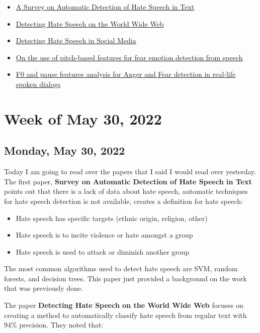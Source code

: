 \documentclass[11pt,letterpaper]{article}
\begin{document}
\begin{itemize}
    \item \href{https://sci-hub.hkvisa.net/10.1145/3232676}{A Survey on Automatic Detection of Hate Speech in Text}
    \item \href{https://aclanthology.org/W12-2103.pdf}{Detecting Hate Speech on the World Wide Web}
    \item \href{https://arxiv.org/abs/1712.06427}{Detecting Hate Speech in Social Media}
    \item \href{https://sci-hub.hkvisa.net/10.1109/ATSIP.2018.8364512}{On the use of pitch-based features for fear emotion detection from speech}
    \item \href{https://www.isca-speech.org/archive_open/sp2004/sp04_205.pdf}{F0 and pause features analysis for Anger and Fear detection in real-life spoken dialogs}
\end{itemize}

\section{Week of May 30, 2022}
\subsection{Monday, May 30, 2022}
Today I am going to read over the papers that I said I would read over yesterday. The first paper, \textbf{Survey on Automatic Detection of Hate Speech in Text} points out that there is a lack of data about hate speech, automatic techniques for hate speech detection is not available, creates a definition for hate speech:

\begin{itemize}
    \item Hate speech has specific targets (ethnic origin, religion, other)
    \item Hate speech is to incite violence or hate amongst a group
    \item Hate speech is used to attack or diminish another group
\end{itemize}

The most common algorithms used to detect hate speech are SVM, random forests, and decision trees. This paper just provided a background on the work that was previously done.

The paper \textbf{Detecting Hate Speech on the World Wide Web} focuses on creating a method to automatically classify hate speech from regular text with 94\% precision. They noted that:
\end{document}
